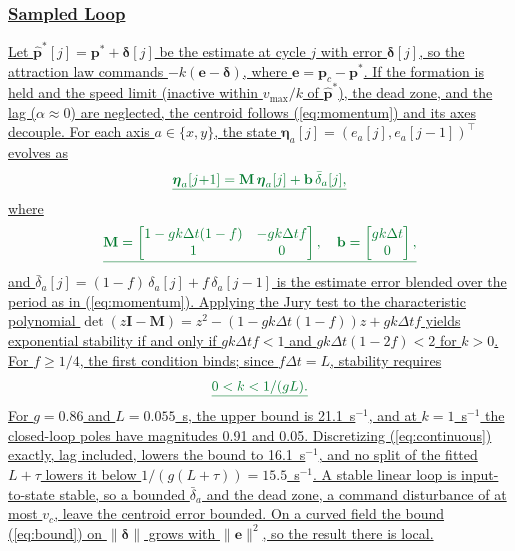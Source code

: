 \documentclass[lettersize,journal]{IEEEtran}
\newcommand{\rev}[1]{#1} %
\providecommand{\DIFadd}[1]{{\protect\color{DIFaddtx}\uline{#1}}} %
\begin{document}
\subsubsection{\DIFadd{Sampled Loop}}
\DIFadd{Let $\hat{\mathbf{p}}^*[j] = \mathbf{p}^* + \boldsymbol{\delta}[j]$ be the estimate at cycle $j$ with error $\boldsymbol{\delta}[j]$, so the attraction law commands $-k(\mathbf{e} - \boldsymbol{\delta})$, where $\mathbf{e} = \mathbf{p}_c - \mathbf{p}^*$. If the formation is held and the speed limit (inactive within $v_{\max}/k$ of $\hat{\mathbf{p}}^*$), the dead zone, and the lag ($\alpha \approx 0$) are neglected, the centroid follows (\ref{eq:momentum}) and its axes decouple. For each axis $a \in \{x, y\}$, the state $\boldsymbol{\eta}_a[j] = (e_a[j], e_a[j-1])^\top$ evolves as
}\begin{equation}\DIFadd{\label{eq:cl}
\boldsymbol{\eta}_a[j{+}1] = \mathbf{M}\,\boldsymbol{\eta}_a[j] + \mathbf{b}\,\bar{\delta}_a[j],
}\end{equation}
\DIFadd{where
}\[
\DIFadd{\mathbf{M} = \begin{bmatrix} 1-gk\Delta t(1-f) & -gk\Delta t f \\ 1 & 0 \end{bmatrix}, \quad \mathbf{b} = \begin{bmatrix} gk\Delta t \\ 0 \end{bmatrix},
}\]
\DIFadd{and $\bar{\delta}_a[j] = (1-f)\,\delta_a[j] + f\,\delta_a[j-1]$ is the estimate error blended over the period as in (\ref{eq:momentum}). Applying the Jury test to the characteristic polynomial $\det(z\mathbf{I} - \mathbf{M}) = z^2 - (1 - gk\Delta t(1-f))z + gk\Delta t f$ yields exponential stability if and only if $gk\Delta t f < 1$ and $gk\Delta t(1-2f) < 2$ for $k > 0$. For $f \ge 1/4$, the first condition binds; since $f\Delta t = L$, stability requires
}\begin{equation}\DIFadd{\label{eq:kmax}
0 < k < 1/(gL).
}\end{equation}
\DIFadd{For $g = 0.86$ and $L = 0.055$~s, the upper bound is \rev{21.1}~s$^{-1}$, and at $k = 1$~s$^{-1}$ the closed-loop poles have magnitudes \rev{0.91} and \rev{0.05}. Discretizing (\ref{eq:continuous}) exactly, lag included, lowers the bound to \rev{16.1}~s$^{-1}$, and no split of the fitted $L+\tau$ lowers it below $1/(g(L+\tau)) = \rev{15.5}$~s$^{-1}$. A stable linear loop is input-to-state stable, so a bounded $\bar{\delta}_a$ and the dead zone, a command disturbance of at most $v_c$, leave the centroid error bounded. On a curved field the bound (\ref{eq:bound}) on $\|\boldsymbol{\delta}\|$ grows with $\|\mathbf{e}\|^2$, so the result there is local.
}
\end{document}
